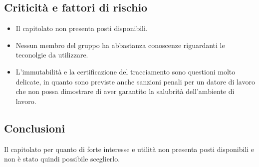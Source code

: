 \subsection{Criticità e fattori di rischio}
\begin{itemize}
    \item Il capitolato non presenta posti disponibili.
    \item Nessun membro del gruppo ha abbastanza conoscenze riguardanti le teconolgie da utilizzare.
    \item L'immutabilità e la certificazione del tracciamento sono questioni molto delicate, in quanto sono previste anche sanzioni penali per un datore di lavoro che non possa dimostrare di aver garantito la salubrità dell’ambiente di lavoro.
\end{itemize}

\subsection{Conclusioni}
Il capitolato per quanto di forte interesse e utilità non presenta posti disponibili e non è stato quindi possibile sceglierlo.